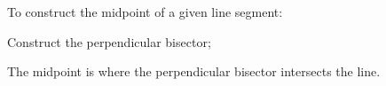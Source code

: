 To construct the midpoint of a given line segment:
\par
Construct the perpendicular bisector;
\par
The midpoint is where the perpendicular bisector intersects
the line.